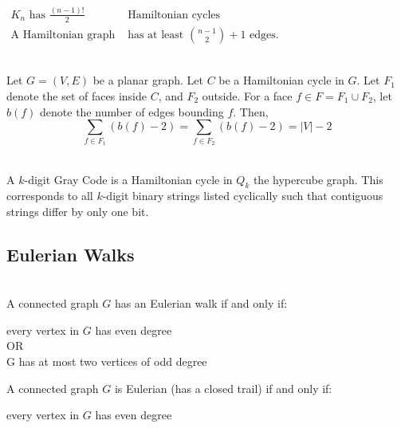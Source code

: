 \documentclass[12pt]{article}
\begin{document}
	\begin{tcolorbox}
	\\
	
	\hfill
	\begin{center}
	$\begin{aligned}
	K_n \text{ has } \frac{(n-1)!}{2}& \text{ Hamiltonian cycles}\\
	 \text{A Hamiltonian graph} &\text{ has at least } {n-1 \choose 2} + 1  \text{ edges.}  
	\end{aligned}$
	\end{center}
	\end{tcolorbox}
	
	\begin{tcolorbox}
	\\
	Let $G =(V,E)$ be a planar graph. Let $C$ be a Hamiltonian cycle in $G$. Let $F_1$ denote the set of faces inside $C$, and $F_2$ outside. For a face $f \in F = F_1 \cup F_2$, let $b(f)$ denote the number of edges bounding $f$. Then,
	$$\sum_{f \in F_1}(b(f) -2) = \sum_{f\in F_2}(b(f) -2) = |V|-2$$
	
	\end{tcolorbox}
	
	
	
	\begin{tcolorbox}
	\\
	A $k$-digit Gray Code is a Hamiltonian cycle in $Q_k$ the hypercube graph.
	This corresponds to all $k$-digit binary strings listed cyclically such that contiguous strings differ by only one bit.
	\end{tcolorbox}
	
	
	
	\subsection{Eulerian Walks}
	\begin{center} \end{center}
	
	\begin{tcolorbox}
	\\
	A connected graph $G$ has an Eulerian walk if and only if: \\
	\begin{center} every vertex in $G$ has even degree \\ \quad OR \quad \\G has at most two vertices of odd degree  \end{center}
	
	\hfill
	
	A connected graph $G$ is Eulerian (has a closed trail) if and only if:
	\begin{center}  every vertex in $G$ has even degree \end{center}
	\end{tcolorbox}
	
\end{document}
